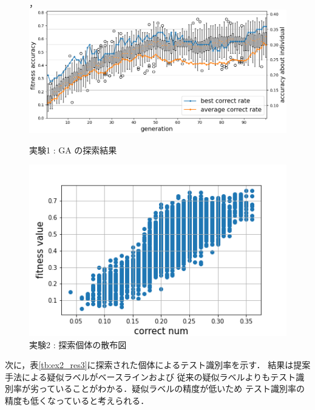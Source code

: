 \begin{figure}[h]
	\begin{center}
		，		\includegraphics[scale=0.65]{./images/ex2_res_graph.png}
		\caption{実験1 : GA の探索結果\label{fig:ex2_res1}}
	\end{center}
\end{figure}


\begin{figure}[h]
	\begin{center}
		\includegraphics[scale=1.0]{./images/ex2_res_img.png}
		\caption{実験2 : 探索個体の散布図\label{fig:ex2_res2}}
	\end{center}
\end{figure}


次に，表\ref{tb:ex2_res3}に探索された個体によるテスト識別率を示す．
結果は提案手法による疑似ラベルがベースラインおよび
従来の疑似ラベルよりもテスト識別率が劣っていることがわかる．疑似ラベルの精度が低いため
テスト識別率の精度も低くなっていると考えられる．

\begin{table}[h]
	\centering
	\caption{実験2 : テスト識別率\label{tb:ex2_res3}}
\end{table}

